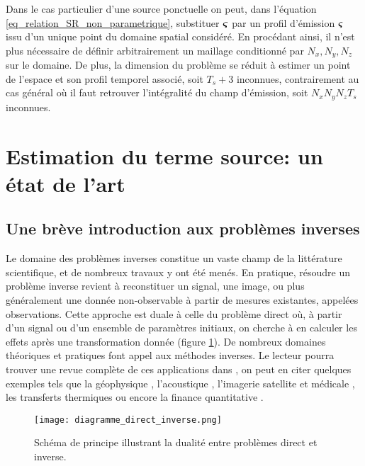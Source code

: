 	Dans le cas particulier d'une source ponctuelle on peut, dans l'équation \eqref{eq_relation_SR_non_parametrique}, substituer ${\bm{\varsigma}}$ par un profil d'émission ${\bm{\varsigma}}$ issu d'un unique point du domaine spatial considéré. En procédant ainsi, il n'est plus nécessaire de définir arbitrairement un maillage conditionné par $N_x, N_y, N_z$  sur le domaine. De plus, la dimension du problème se réduit à estimer un point de l'espace et son profil temporel associé, soit $T_s + 3$ inconnues, contrairement au cas général où il faut retrouver l'intégralité du champ d'émission, soit $N_xN_yN_zT_s$ inconnues.\\
	
		
	\section{Estimation du terme source: un état de l'art}
	\label{section_etat_art_STE}
	
	\subsection{Une brève introduction aux problèmes inverses}
	Le domaine des problèmes inverses constitue un vaste champ de la littérature scientifique, et de nombreux travaux y ont été menés. En pratique, résoudre un problème inverse revient à reconstituer un signal, une image, ou plus généralement une donnée non-observable à partir de mesures existantes, appelées observations.
	Cette approche est duale à celle du problème direct où, à partir d'un signal ou d'un ensemble de paramètres initiaux, on cherche à en calculer les effets après une transformation donnée (figure \ref{fig_diagramme_direct_inverse}).
	De nombreux domaines théoriques et pratiques font appel aux méthodes inverses. Le lecteur pourra trouver une revue complète de ces applications dans \cite{Tarantola2004}, on peut en citer quelques exemples tels que la géophysique \cite{Backus1967}, l'acoustique \cite{Kirsch1988}, l'imagerie satellite \cite{Park2003} et médicale \cite{Arridge1999}, les transferts thermiques \cite{McCormik1992} ou encore la finance quantitative \cite{Dembo1999}.\\
	
	\begin{figure}
		\centering
		\texttt{[image: diagramme\_direct\_inverse.png]}
		\caption{Schéma de principe illustrant la dualité entre problèmes direct et inverse.}
		\label{fig_diagramme_direct_inverse}
	\end{figure}
	
